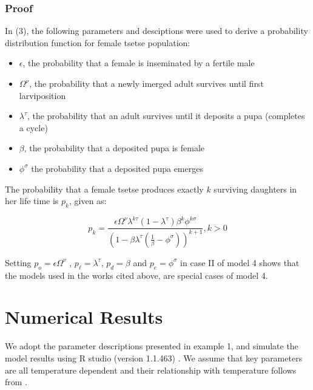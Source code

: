 \documentclass[smallextended]{svjour3}
\begin{document}
\subsubsection*{Proof}

In (3), the following parameters and desciptions were used to derive a probability distribution function for female tsetse population: 
\begin{itemize}
	\item $\epsilon$, the probability that a female is inseminated by a fertile male 
	\item $\Omega^{\nu}$,  the probability that a newly imerged adult survives until first larviposition
	\item $ \lambda^{\tau}$, the probability that an adult survives until it deposits a pupa (completes a cycle)
	\item $\beta$,  the probability that a deposited pupa is female 
	\item $\phi^{\sigma}$  the probability that a deposited pupa emerges
\end{itemize}

The probability that a female tsetse produces exactly $k$ surviving daughters in her life time is $p_{k}$, given as:

\begin{equation}
\label{Johnframework}
p_{k}= \frac{\epsilon \Omega^{\nu}\lambda^{k\tau}(1-\lambda^{\tau})\beta^{k}\phi^{k\sigma}}{(1-\beta \lambda^\tau(\frac{1}{\beta} -\phi^{\sigma}))^{k+1}},   k>0   
\end{equation}

Setting  $ p_{o}= \epsilon \Omega^{\nu}$ , $p_{\ell} =\lambda^{\tau} $, $p_{d}=\beta$  and $p_{e} = \phi^{\sigma} $ in case II of model 4 shows that the models used in the works cited above, are special cases of model 4. 



\section{Numerical Results}

We adopt the parameter descriptions presented in example 1, and simulate the model results using R studio (version 1.1.463) \cite{RStudioTeam2016}. We assume that key parameters are all temperature dependent and their relationship with temperature follows from \cite{Lord2018,PhelpsR.J.&Burrows,Hargrove2004a,Hargrove2019a}.\\
\end{document}
